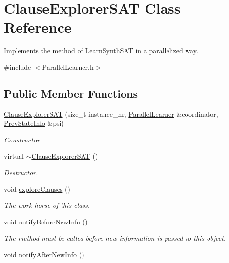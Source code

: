 \hypertarget{classClauseExplorerSAT}{\section{Clause\-Explorer\-S\-A\-T Class Reference}
\label{classClauseExplorerSAT}
}


Implements the method of \hyperlink{classLearnSynthSAT}{Learn\-Synth\-S\-A\-T} in a parallelized way.  




{\ttfamily \#include $<$Parallel\-Learner.\-h$>$}

\subsection*{Public Member Functions}
\begin{DoxyCompactItemize}
\item 
\hyperlink{classClauseExplorerSAT_ae8e5b1f550ce963fd5d516dc489eef27}{Clause\-Explorer\-S\-A\-T} (size\-\_\-t instance\-\_\-nr, \hyperlink{classParallelLearner}{Parallel\-Learner} \&coordinator, \hyperlink{classPrevStateInfo}{Prev\-State\-Info} \&psi)
\begin{DoxyCompactList}\small\item\em Constructor. \end{DoxyCompactList}\item 
virtual \hyperlink{classClauseExplorerSAT_aa5e321a156ef7fa6e21946594e500668}{$\sim$\-Clause\-Explorer\-S\-A\-T} ()
\begin{DoxyCompactList}\small\item\em Destructor. \end{DoxyCompactList}\item 
void \hyperlink{classClauseExplorerSAT_aae50270504a523ae79458c7eb1f2e9d1}{explore\-Clauses} ()
\begin{DoxyCompactList}\small\item\em The work-\/horse of this class. \end{DoxyCompactList}\item 
void \hyperlink{classClauseExplorerSAT_a36134b9b6f662c44de73e76146c256bd}{notify\-Before\-New\-Info} ()
\begin{DoxyCompactList}\small\item\em The method must be called before new information is passed to this object. \end{DoxyCompactList}\item 
void \hyperlink{classClauseExplorerSAT_a8289e4ba9921717f705a1b2fb2655761}{notify\-After\-New\-Info} ()

\end{DoxyCompactItemize}
